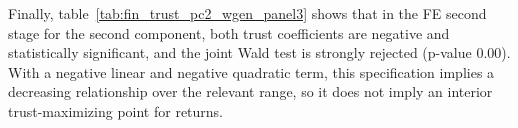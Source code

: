 \label{tab:fin_trust_pc2_wgen_panel1}
\FloatBarrier

\par Finally, table~\ref{tab:fin_trust_pc2_wgen_panel3} shows that in the FE second stage for the second component, both trust coefficients are negative and statistically significant, and the joint Wald test is strongly rejected (p-value 0.00). With a negative linear and negative quadratic term, this specification implies a decreasing relationship over the relevant range, so it does not imply an interior trust-maximizing point for returns.

\label{tab:fin_trust_pc2_wgen_panel3}
\FloatBarrier









